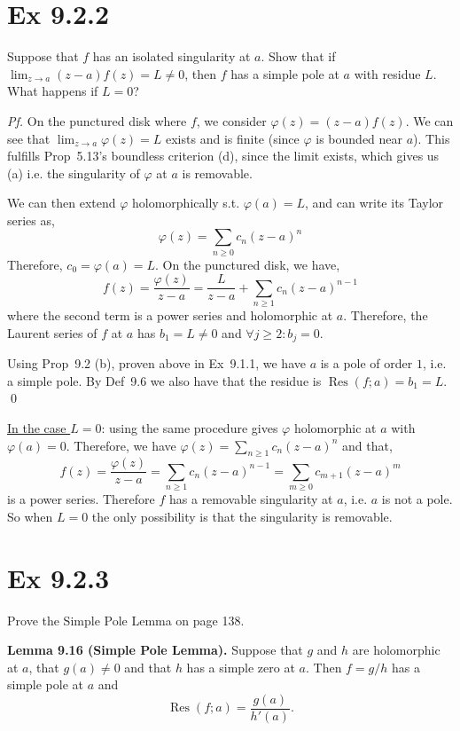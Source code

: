 \documentclass[a4paper]{article}
\DeclareMathOperator{\Res}{Res}
\begin{document}
\newpage
\section*{Ex 9.2.2}

\begin{prob}
Suppose that $f$ has an isolated singularity at $a$. Show that if
$\lim_{z\to a}(z-a)f(z)=L\ne 0$, then $f$ has a simple pole at $a$ with residue
$L$. What happens if $L=0$?
\end{prob}

\textit{Pf.} On the punctured disk where $f$, we consider $\varphi(z)=(z-a)f(z)$. We can see that $\lim_{z\to a}\varphi(z)=L$ exists and is finite (since $\varphi$ is bounded near $a$). This fulfills Prop~5.13's boundless criterion (d), since the limit exists, which gives us (a) i.e. the singularity of $\varphi$ at $a$ is removable.

\medskip
We can then extend $\varphi$ holomorphically s.t. $\varphi(a)=L$, and can write its Taylor series as,
\[
\varphi(z)=\sum_{n\ge 0}c_n(z-a)^n
\]
Therefore, $c_0=\varphi(a)=L$. On the punctured disk, we have,
\[
f(z)=\frac{\varphi(z)}{z-a}=\frac{L}{z-a}+\sum_{n\ge 1}c_n(z-a)^{n-1}
\]
where the second term is a power series and holomorphic at $a$. Therefore, the Laurent series of $f$ at $a$ has $b_1=L\ne 0$ and $\forall j \ge 2: b_j=0$. 

\medskip
Using Prop~9.2 (b), proven above in Ex~9.1.1, we have $a$ is a pole of order $1$, i.e. a simple pole. By Def~9.6 we also have that the residue is $\Res(f;a)=b_1=L$. \qed

\medskip
\underline{In the case $L=0$}: using the same procedure gives $\varphi$ holomorphic at $a$ with $\varphi(a)=0$. Therefore, we have $\varphi(z)=\sum_{n\ge 1}c_n(z-a)^n$ and that,
\[
f(z)=\frac{\varphi(z)}{z-a}=\sum_{n\ge 1}c_n(z-a)^{n-1}=\sum_{m\ge 0}c_{m+1}(z-a)^m
\]
is a power series. Therefore $f$ has a removable singularity at $a$, i.e. $a$ is not a pole. So when $L=0$ the only possibility is that the
singularity is removable.

\newpage
\section*{Ex 9.2.3}

\begin{prob}
Prove the Simple Pole Lemma on page 138.

\medskip
\textbf{Lemma 9.16 (Simple Pole Lemma).} Suppose that $g$ and $h$ are holomorphic
at $a$, that $g(a)\ne 0$ and that $h$ has a simple zero at $a$. Then $f=g/h$ has
a simple pole at $a$ and
\[
\Res(f;a)=\frac{g(a)}{h'(a)}.
\]
\end{prob}
\end{document}
